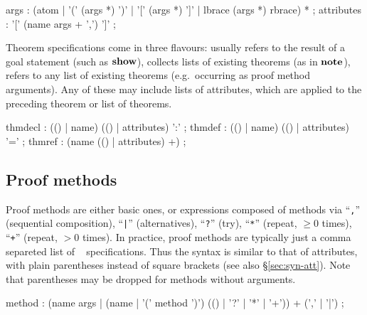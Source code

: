 \begin{rail}
  args : (atom | '(' (args *) ')' | '[' (args *) ']' | lbrace (args *) rbrace) *
  ;
  attributes : '[' (name args + ',') ']'
  ;
\end{rail}

Theorem specifications come in three flavours:  usually
refers to the result of a goal statement (such as ${\mathord{\mathbf{show}}}$),
 collects lists of existing theorems (as in ${\mathord{\mathbf{note}}}$),
 refers to any list of existing theorems (e.g.\ occurring
as proof method arguments).  Any of these may include lists of attributes,
which are applied to the preceding theorem or list of theorems.

\begin{rail}
  thmdecl : (() | name) (() | attributes) ':'
  ;
  thmdef : (() | name) (() | attributes) '='
  ;
  thmref : (name (() | attributes) +)
  ;
\end{rail}


\subsection{Proof methods}\label{sec:syn-meth}

Proof methods are either basic ones, or expressions composed of methods via
``\texttt{,}'' (sequential composition), ``\texttt{|}'' (alternatives),
``\texttt{?}'' (try), ``\texttt{*}'' (repeat, ${} \ge 0$ times),
``\texttt{+}'' (repeat, ${} > 0$ times).  In practice, proof methods are
typically just a comma separeted list of ~
specifications.  Thus the syntax is similar to that of attributes, with plain
parentheses instead of square brackets (see also \S\ref{sec:syn-att}).  Note
that parentheses may be dropped for methods without arguments.

\begin{rail}
  method : (name args | (name | '(' method ')') (() | '?' | '*' | '+')) + (',' | '|')
  ;
\end{rail}


